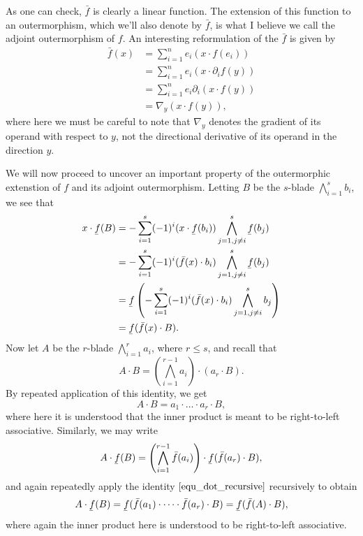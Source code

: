 \documentclass[12pt]{article}
\newcommand{\uf}{\underaccent{\bar}{f}}
\newcommand{\of}{\bar{f}}
\begin{document}
As one can check, $\of$ is clearly a linear function.  The extension of this
function to an outermorphism, which we'll also denote by $\of$, is what
I believe we call the adjoint outermorphism of $f$.  An interesting reformulation
of the $\of$ is given by
\begin{align*}
\of(x) &= \sum_{i=1}^n e_i(x\cdot f(e_i)) \\
 &= \sum_{i=1}^n e_i(x\cdot\partial_i f(y)) \\
 &= \sum_{i=1}^n e_i\partial_i(x\cdot f(y)) \\
 &= \nabla_y(x\cdot f(y)),
\end{align*}
where here we must be careful to note that $\nabla_y$ denotes the gradient of its operand
with respect to $y$, not the directional derivative of its operand in the direction $y$.

We will now proceed to uncover an important property of the outermorphic extenstion
of $f$ and its adjoint outermorphism.  Letting $B$ be the $s$-blade $\bigwedge_{i=1}^s b_i$,
we see that
\begin{align*}
x\cdot \uf(B) &= -\sum_{i=1}^s(-1)^i(x\cdot\uf(b_i))\bigwedge_{j=1,j\neq i}^s\uf(b_j) \\
 &= -\sum_{i=1}^s(-1)^i(\of(x)\cdot b_i)\bigwedge_{j=1,j\neq i}^s\uf(b_j) \\
 &= \uf\left(-\sum_{i=1}^s(-1)^i(\of(x)\cdot b_i)\bigwedge_{j=1,j\neq i}^s b_j\right) \\
 &= \uf(\of(x)\cdot B).
\end{align*}
Now let $A$ be the $r$-blade $\bigwedge_{i=1}^r a_i$, where $r\leq s$, and recall
that
\begin{equation}\label{equ_dot_recursive}
A\cdot B = \left(\bigwedge_{i=1}^{r-1} a_i\right)\cdot(a_r\cdot B).
\end{equation}
By repeated application of this identity, we get
\begin{equation*}
A\cdot B = a_1\cdot\dots\cdot a_r\cdot B,
\end{equation*}
where here it is understood that the inner product is meant to be right-to-left associative.
Similarly, we may write
\begin{equation*}
A\cdot\uf(B) = \left(\bigwedge_{i=1}^{r-1}\of(a_i)\right)\cdot\uf(\of(a_r)\cdot B),
\end{equation*}
and again repeatedly apply the identity $\eqref{equ_dot_recursive}$ recursively
to obtain
\begin{equation*}
A\cdot\uf(B) = \uf(\of(a_1)\cdot\dots\cdot\of(a_r)\cdot B) = \uf(\of(A)\cdot B),
\end{equation*}
where again the inner product here is understood to be right-to-left associative.
\end{document}
